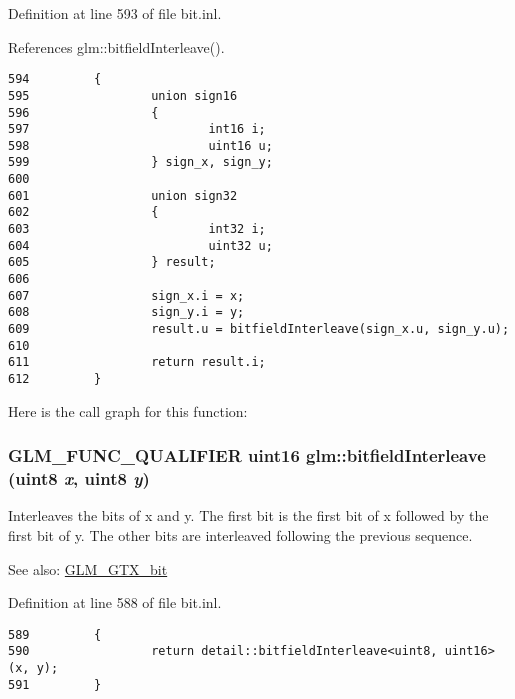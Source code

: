 Definition at line 593 of file bit.inl.

References glm::bitfieldInterleave().

\begin{Code}\begin{verbatim}594         {
595                 union sign16
596                 {
597                         int16 i;
598                         uint16 u;
599                 } sign_x, sign_y;
600 
601                 union sign32
602                 {
603                         int32 i;
604                         uint32 u;
605                 } result;
606 
607                 sign_x.i = x;
608                 sign_y.i = y;
609                 result.u = bitfieldInterleave(sign_x.u, sign_y.u);
610 
611                 return result.i;
612         }
\end{verbatim}
\end{Code}




Here is the call graph for this function:\hypertarget{group__gtx__bit_g0700a3ceb088a0ecc23d76c154096061}{
\subsubsection[bitfieldInterleave]{\setlength{\rightskip}{0pt plus 5cm}GLM\_\-FUNC\_\-QUALIFIER uint16 glm::bitfieldInterleave (uint8 {\em x}, \/  uint8 {\em y})}}
\label{group__gtx__bit_g0700a3ceb088a0ecc23d76c154096061}


Interleaves the bits of x and y. The first bit is the first bit of x followed by the first bit of y. The other bits are interleaved following the previous sequence.

\begin{Desc}
\item[See also:]\hyperlink{group__gtx__bit}{GLM\_\-GTX\_\-bit} \end{Desc}


Definition at line 588 of file bit.inl.

\begin{Code}\begin{verbatim}589         {
590                 return detail::bitfieldInterleave<uint8, uint16>(x, y);
591         }
\end{verbatim}
\end{Code}


